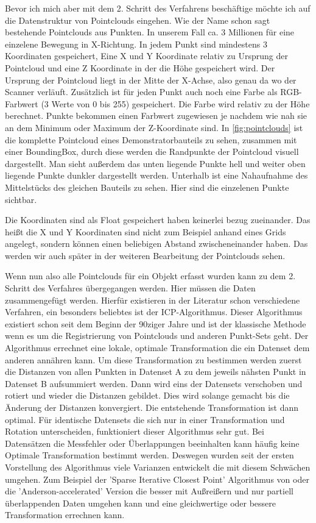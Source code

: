 \documentclass[../main.tex]{subfiles}
\begin{document}
Bevor ich mich aber mit dem 2. Schritt des Verfahrens beschäftige möchte ich auf die 
Datenstruktur von Pointclouds eingehen. Wie der Name schon sagt bestehende
Pointclouds aus Punkten. In unserem Fall ca. 3 Millionen für eine einzelene
Bewegung in X-Richtung. In jedem Punkt sind mindestens 3 Koordinaten gespeichert, 
Eine X und Y Koordinate relativ zu Ursprung der Pointcloud und eine Z Koordinate 
in der die Höhe gespeichert wird. Der Ursprung der Pointcloud liegt in der Mitte 
der X-Achse, also genau da wo der Scanner verläuft.
Zusätzlich ist für jeden Punkt auch noch eine Farbe als RGB-Farbwert
(3 Werte von 0 bis 255) gespeichert. Die Farbe wird relativ zu der Höhe
berechnet. Punkte bekommen einen Farbwert zugewiesen je nachdem wie nah 
sie an dem Minimum oder Maximum der Z-Koordinate sind. 
In \ref{fig:pointclouds} ist die komplette Pointcloud eines Demonstratorbauteils 
zu sehen, zusammen mit einer BoundingBox, durch diese werden die Randpunkte
der Pointcloud visuell dargestellt. Man sieht außerdem das unten liegende Punkte
hell und weiter oben liegende Punkte dunkler dargestellt werden.
Unterhalb ist eine Nahaufnahme des Mittelstücks des gleichen Bauteils zu sehen. 
Hier sind die einzelenen Punkte sichtbar.

Die Koordinaten sind als Float gespeichert haben keinerlei bezug zueinander.
Das heißt die X und Y Koordinaten sind nicht zum Beispiel anhand eines Grids 
angelegt, sondern können einen beliebigen Abstand zwischeneinander haben. Das
werden wir auch später in der weiteren Bearbeitung der Pointclouds sehen.

Wenn nun also alle Pointclouds für ein Objekt erfasst wurden kann zu dem 2.
Schritt des Verfahres übergegangen werden. Hier müssen die Daten zusammengefügt 
werden. 
Hierfür existieren in der Literatur schon verschiedene Verfahren, ein 
besonders beliebtes ist der ICP-Algorithmus.
Dieser Algorithmus existiert schon seit dem Beginn der 90ziger Jahre und ist 
der klassische Methode wenn es um die Registrierung von Pointclouds und 
anderen Punkt-Sets geht. \cite[]{icp}
Der Algorithmus errechnet eine lokale, optimale Transformation die ein Datenset
dem anderen annähren kann. \cite{icp_og}
Um diese Transformation zu bestimmen werden zuerst die Distanzen von allen 
Punkten in Datenset A zu dem jeweils nähsten Punkt in Datenset B aufsummiert 
werden. Dann wird eins der Datensets verschoben und rotiert und wieder die 
Distanzen gebildet. Dies wird solange gemacht bis die Änderung der Distanzen 
konvergiert. Die entstehende Transformation ist dann optimal.
Für identische Datensets die sich nur in einer Transformation und Rotation 
unterscheiden, funktioniert dieser Algorithmus sehr gut. Bei Datensätzen die 
Messfehler oder Überlappungen beeinhalten kann häufig keine Optimale 
Transformation bestimmt werden.
Deswegen wurden seit der ersten Vorstellung des Algorithmus viele Varianzen
entwickelt die mit diesem Schwächen umgehen. 
Zum Beispiel der 'Sparse Iterative Closest Point' Algorithmus von \cite{Bouaziz.2013}
oder die 'Anderson-accelerated' Version die besser mit Außreißern und nur 
partiell überlappenden Daten umgehen kann und eine gleichwertige oder bessere 
Transformation errechnen kann. \cite{icp}
\end{document}
